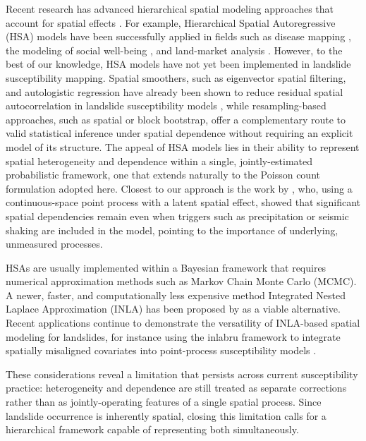 \documentclass[journal abbreviation, manuscript]{copernicus}
\newcommand{\hl}[1]{#1}
\newcommand{\hlG}[1]{#1}
\newcommand{\hlE}[1]{#1}
\begin{document}
Recent research has advanced hierarchical spatial modeling approaches that account for spatial effects \citep{dong2015multilevel, morris2019bayesian, lawson2018bayesian}. 
For example, Hierarchical Spatial Autoregressive (HSA) models have been successfully applied in fields such as disease mapping \citep{vranckx2019comparison}, the modeling of social well-being \citep{pierewan2014spatial}, and land-market analysis \citep{dong2015multilevel}. 
However, to the best of our knowledge, HSA models have not yet been implemented in landslide susceptibility mapping. 
\hl{Spatial smoothers, such as eigenvector spatial filtering, and autologistic regression have already been shown to reduce residual spatial autocorrelation in landslide susceptibility models }\citep{li2019eigenvector}\hl{, while resampling-based approaches, such as spatial or block bootstrap, offer a complementary route to valid statistical inference under spatial dependence without requiring an explicit model of its structure. 
The appeal of HSA models lies in their ability to represent spatial heterogeneity and dependence within a single, jointly-estimated probabilistic framework, one that extends naturally to the Poisson count formulation adopted here. 
Closest to our approach is the work by }\citet{lombardo2018point, lombardo2019geostatistical, lombardo2020space}\hl{, who}, using a continuous-space point process with a latent spatial effect, \hlE{showed that significant spatial dependencies remain even when triggers such as precipitation or seismic shaking are included in the model, pointing to the importance of underlying, unmeasured processes.}

HSAs are usually implemented within a Bayesian framework that requires numerical approximation methods such as Markov Chain Monte Carlo (MCMC). 
A newer, faster, and computationally less expensive method Integrated Nested Laplace Approximation (INLA) has been proposed by \citet{rue2005gaussian} as a viable alternative. 
\hlG{Recent applications continue to demonstrate the versatility of INLA-based spatial modeling for landslides, for instance using the inlabru framework to integrate spatially misaligned covariates into point-process susceptibility models }\citep{suen2025river}\hlG{.}

\hlG{These considerations reveal a limitation that persists across current susceptibility practice: heterogeneity and dependence are still treated as separate corrections rather than as jointly-operating features of a single spatial process. 
Since landslide occurrence is inherently spatial, closing this limitation calls for a hierarchical framework capable of representing both simultaneously.}
\end{document}
